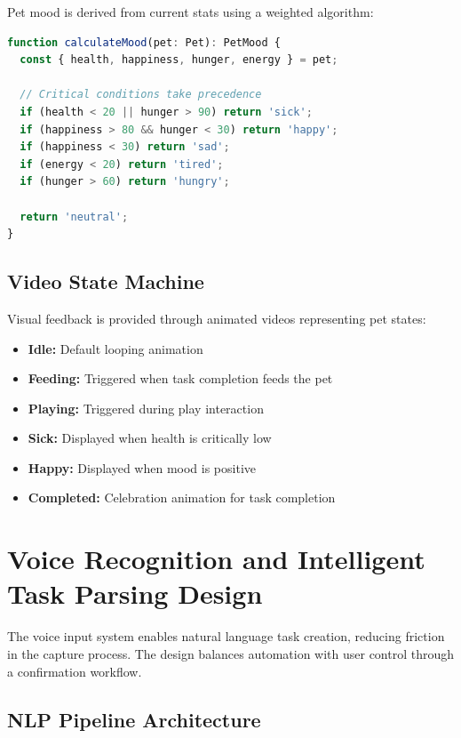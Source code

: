 Pet mood is derived from current stats using a weighted algorithm:

\begin{lstlisting}[language=TypeScript, caption=Mood Calculation Algorithm]
function calculateMood(pet: Pet): PetMood {
  const { health, happiness, hunger, energy } = pet;
  
  // Critical conditions take precedence
  if (health < 20 || hunger > 90) return 'sick';
  if (happiness > 80 && hunger < 30) return 'happy';
  if (happiness < 30) return 'sad';
  if (energy < 20) return 'tired';
  if (hunger > 60) return 'hungry';
  
  return 'neutral';
}
\end{lstlisting}

\subsection{Video State Machine}

Visual feedback is provided through animated videos representing pet states:

\begin{itemize}
    \item \textbf{Idle:} Default looping animation
    \item \textbf{Feeding:} Triggered when task completion feeds the pet
    \item \textbf{Playing:} Triggered during play interaction
    \item \textbf{Sick:} Displayed when health is critically low
    \item \textbf{Happy:} Displayed when mood is positive
    \item \textbf{Completed:} Celebration animation for task completion
\end{itemize}

\section{Voice Recognition and Intelligent Task Parsing Design}
\label{sec:voice-design}

\completed

The voice input system enables natural language task creation, reducing friction in the capture process. The design balances automation with user control through a confirmation workflow.

\subsection{NLP Pipeline Architecture}

